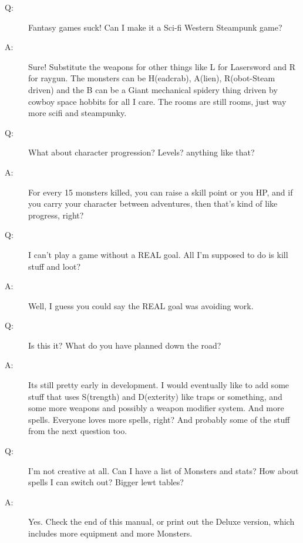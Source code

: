 \documentclass[a6paper,hidelinks]{article}
\begin{document}
\begin{description}
\item[Q:]  Fantasy games suck! Can I make it a Sci-fi Western Steampunk game?
\item[A:]  Sure! Substitute the weapons for other things like L for Lasersword and R for raygun. The monsters can be H(eadcrab), A(lien), R(obot-Steam driven) and the B can be a Giant mechanical spidery thing driven by cowboy space hobbits for all I care. The rooms are still rooms, just way more scifi and steampunky.
\end{description}

\begin{description}
\item[Q:]  What about character progression? Levels? anything like that?
\item[A:]  For every 15 monsters killed, you can raise a skill point or you HP, and if you carry your character between adventures, then that’s kind of like progress, right?
\end{description}

\begin{description}
\item[Q:]  I can't play a game without a REAL goal. All I'm supposed to do is kill stuff and loot?
\item[A:]  Well, I guess you could say the REAL goal was avoiding work.
\end{description}

\begin{description}
\item[Q:]  Is this it? What do you have planned down the road?
\item[A:]  Its still pretty early in development. I would eventually like to add some stuff that uses S(trength) and D(exterity) like traps or something, and some more weapons and possibly a weapon modifier system. And more spells. Everyone loves more spells, right? And probably some of the stuff from the next question too.
\end{description}

\begin{description}
\item[Q:]  I'm not creative at all. Can I have a list of Monsters and stats? How about spells I can switch out? Bigger lewt tables?
\item[A:]   Yes. Check the end of this manual, or print out the Deluxe version, which includes more equipment and more Monsters.
\end{description}
\end{document}
